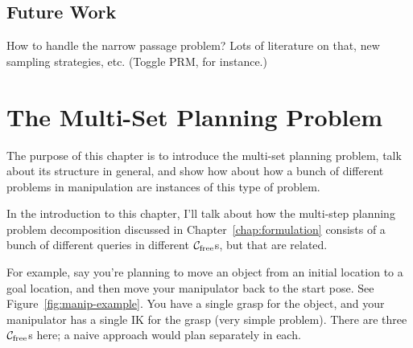 \documentclass{report}
\begin{document}
\section{Future Work}

How to handle the narrow passage problem?
Lots of literature on that, new sampling strategies, etc.
(Toggle PRM, for instance.)


\newpage
\chapter{The Multi-Set Planning Problem}
\label{chap:multi-set}

The purpose of this chapter is to introduce the multi-set planning
problem,
talk about its structure in general,
and show how about how a bunch of different problems in manipulation
are instances of this type of problem.

In the introduction to this chapter,
I'll talk about how the multi-step planning problem decomposition
discussed in Chapter~\ref{chap:formulation}
consists of a bunch of different queries in different
$\mathcal{C}_{\mbox{\scriptsize free}}$s, but that are related.

For example, say you're planning to move an object from an initial
location to a goal location,
and then move your manipulator back to the start pose.
See Figure~\ref{fig:manip-example}.
You have a single grasp for the object,
and your manipulator has a single IK for the grasp (very simple problem).
There are three $\mathcal{C}_{\mbox{\scriptsize free}}$s here;
a naive approach would plan separately in each.
\end{document}
